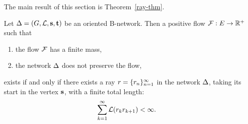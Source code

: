 \documentclass[12pt,oneside,a4paper]{amsart}
\begin{document}
    The main result of this section is Theorem~\ref{ray-thm}.
    \begin{theorem}
      \label{ray-thm}
      Let $\Delta = (G, \mathcal{L}, \mathbf{s}, \mathbf{t})$ be an oriented B-network.
      Then a positive flow $\mathcal{F}: E \to \mathbb{R}^{+}$ such that
      \begin{enumerate}[label=(\alph*)]
        \item the flow $\mathcal{F}$ has a finite mass,
        \item the network $\Delta$ does not preserve the flow,
      \end{enumerate}
      exists if and only if there exists a ray $r = \{{r}_n\}_{n=1}^\infty$ in the network $\Delta$, taking its start in the vertex $\mathbf{s}$,
        with a finite total length:
      \[
        \sum_{k=1}^\infty \mathcal{L}(r_k r_{k+1}) < \infty.
      \]
    \end{theorem}
\end{document}
